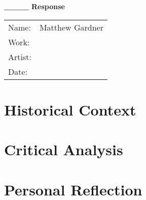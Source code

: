 \documentclass[onecolumn, 12pt]{article}
\title{}
\author{Matthew Gardner}
\date{}
\begin{document}
\textbf{____ Response}

\begin{tabular}{ll}
  Name:&Matthew Gardner \\
  Work:& \\
  Artist:& \\
  Date:& \\
\end{tabular}

\section*{Historical Context}

\section*{Critical Analysis}

\section*{Personal Reflection}
\end{document}
